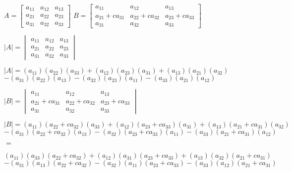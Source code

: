 \documentclass{report}
\begin{document}
\begin{center}
$ 	A=
	\begin{bmatrix}
		a_{11} & a_{12} & a_{13}\\
		a_{21} & a_{22} & a_{23}\\
		a_{31} & a_{32} & a_{33}
	\end{bmatrix}	
$
$ 	B=
	\begin{bmatrix}
		a_{11} & a_{12} & a_{13}\\
		a_{21}+ca_{31} & a_{22}+ca_{32} & a_{23}+ca_{33}\\
		a_{31} & a_{32} & a_{33}
	\end{bmatrix}	
$
\end{center}
\begin{center}
$	|A|=
	\begin{vmatrix}
		a_{11} & a_{12} & a_{13}\\
		a_{21} & a_{22} & a_{23}\\
		a_{31} & a_{32} & a_{33}
	\end{vmatrix}
$
\end{center}
\begin{center}
$
	|A|=(a_{11})(a_{22})(a_{33})+(a_{12})(a_{23})(a_{31})+(a_{13})(a_{21})(a_{32})	
$
\\
$
	-(a_{31})(a_{22})(a_{13})-(a_{32})(a_{23})(a_{11})-(a_{33})(a_{21})(a_{12})
$
\end{center}
\begin{center}
$	|B|=
	\begin{vmatrix}
		a_{11} 			& a_{12} 			& a_{13}\\
		a_{21}+ca_{31} 	& a_{22}+ca_{32} 	& a_{23}+ca_{33}\\
		a_{31} 			& a_{32} 			& a_{33}
	\end{vmatrix}
$
\end{center}
\begin{center}
$
|B|=(a_{11})(a_{22}+ca_{32})(a_{33})+(a_{12})(a_{23}+ca_{33})(a_{31})+(a_{13})(a_{21}+ca_{31})(a_{32})
$
\\
$
-(a_{31})(a_{22}+ca_{32})(a_{13})-(a_{32})(a_{23}+ca_{33})(a_{11})-(a_{33})(a_{21}+ca_{31})(a_{12})
$
\end{center}
\begin{center}
$=$
\end{center}
\begin{center}
$
(a_{11})(a_{33})(a_{22}+ca_{32})+(a_{12})(a_{31})(a_{23}+ca_{33})+(a_{13})(a_{32})(a_{21}+ca_{31})
$
\\
$
-(a_{31})(a_{13})(a_{22}+ca_{32})-(a_{32})(a_{11})(a_{23}+ca_{33})-(a_{33})(a_{12})(a_{21}+ca_{31})
$
\end{center}
\end{document}
